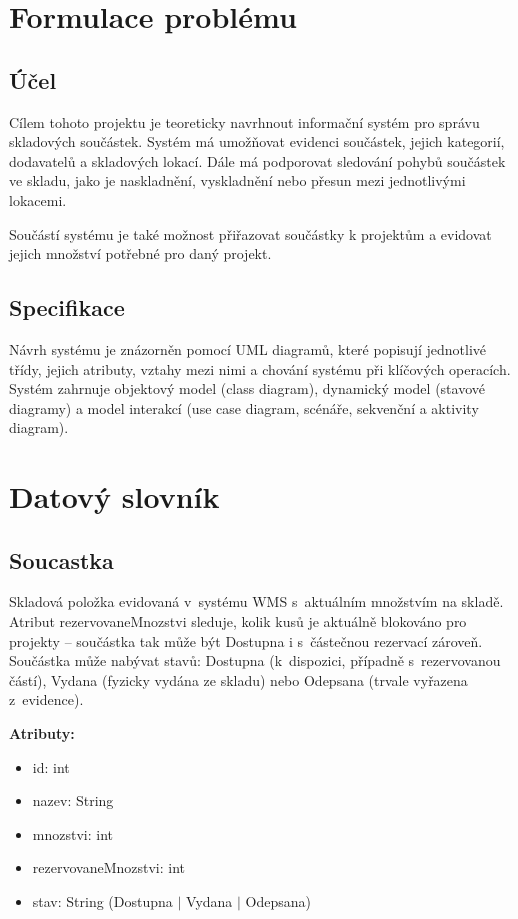 \chapter{Formulace problému}

\section{Účel}

Cílem tohoto projektu je teoreticky navrhnout informační systém pro správu skladových
součástek. Systém má umožňovat evidenci součástek, jejich kategorií, dodavatelů
a skladových lokací. Dále má podporovat sledování pohybů součástek ve skladu,
jako je naskladnění, vyskladnění nebo přesun mezi jednotlivými lokacemi.

Součástí systému je také možnost přiřazovat součástky k projektům a evidovat
jejich množství potřebné pro daný projekt.

\section{Specifikace}

Návrh systému je znázorněn pomocí UML diagramů, které popisují jednotlivé třídy,
jejich atributy, vztahy mezi nimi a chování systému při klíčových operacích.
Systém zahrnuje objektový model (class diagram), dynamický model (stavové diagramy)
a model interakcí (use case diagram, scénáře, sekvenční a aktivity diagram).

\chapter{Datový slovník}

\section{Soucastka}

Skladová položka evidovaná v~systému WMS s~aktuálním množstvím na skladě. Atribut rezervovaneMnozstvi sleduje, kolik kusů je aktuálně blokováno pro projekty -- součástka tak může být Dostupna i s~částečnou rezervací zároveň. Součástka může nabývat stavů: Dostupna (k~dispozici, případně s~rezervovanou částí), Vydana (fyzicky vydána ze skladu) nebo Odepsana (trvale vyřazena z~evidence).

\textbf{Atributy:}\begin{itemize}[noitemsep,topsep=2pt]\item id: int\item nazev: String\item mnozstvi: int\item rezervovaneMnozstvi: int\item stav: String (Dostupna $|$ Vydana $|$ Odepsana)\end{itemize}

